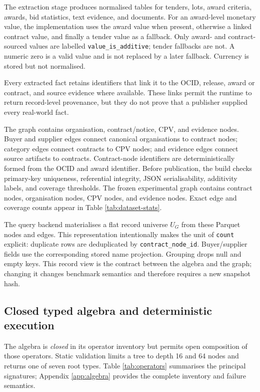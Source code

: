 The extraction stage produces normalised tables for tenders, lots, award criteria, awards, bid
statistics, text evidence, and documents.  For an award-level monetary value, the implementation
uses the award value when present, otherwise a linked contract value, and finally a tender value
as a fallback.  Only award- and contract-sourced values are labelled
\texttt{value\_is\_additive}; tender fallbacks are not.  A numeric zero is a valid value and is
not replaced by a later fallback.  Currency is stored but not normalised.

Every extracted fact retains identifiers that link it to the OCID, release, award or contract,
and source evidence where available.  These links permit the runtime to return record-level
provenance, but they do not prove that a publisher supplied every real-world fact.

The graph contains organisation, contract/notice, CPV, and evidence nodes.  Buyer and supplier
edges connect canonical organisations to contract nodes; category edges connect contracts to
CPV nodes; and evidence edges connect source artifacts to contracts.  Contract-node identifiers
are deterministically formed from the OCID and award identifier.  Before publication, the build
checks primary-key uniqueness, referential integrity, JSON serialisability, additivity labels,
and coverage thresholds.  The frozen experimental graph contains \KGContracts contract nodes,
\KGOrgs organisation nodes, \KGCPV CPV nodes, and \KGEvidence evidence nodes.  Exact edge and
coverage counts appear in Table \ref{tab:dataset-stats}.

The query backend materialises a flat record universe $U_G$ from these Parquet nodes and edges.
This representation intentionally makes the unit of \texttt{count} explicit: duplicate rows are
deduplicated by \texttt{contract\_node\_id}.  Buyer/supplier fields use the corresponding stored
name projection.  Grouping drops null and empty keys.  This record view is the contract between
the algebra and the graph; changing it changes benchmark semantics and therefore requires a new
snapshot hash.

\subsection{Closed typed algebra and deterministic execution}
\label{sec:algebra}

The algebra is \emph{closed} in its operator inventory but permits open composition of those
operators.  Static validation limits a tree to depth 16 and 64 nodes and returns one of seven
root types.  Table \ref{tab:operators} summarises the principal signatures; Appendix
\ref{app:algebra} provides the complete inventory and failure semantics.

